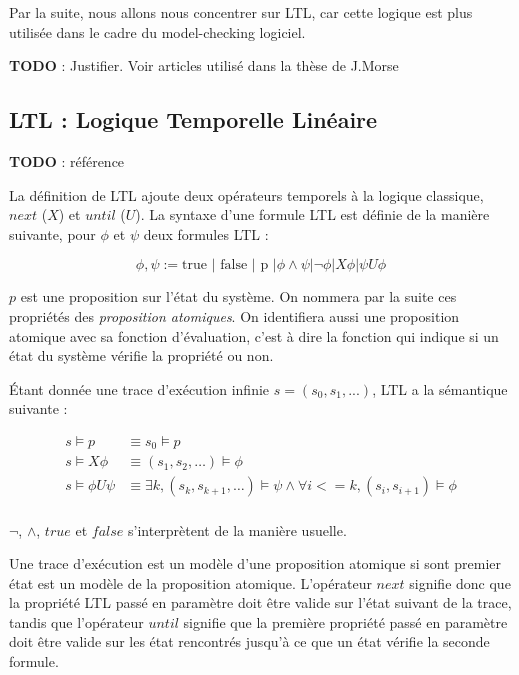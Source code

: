 Par la suite, nous allons nous concentrer sur LTL, car cette logique est
plus utilisée dans le cadre du model-checking logiciel.

\textbf{TODO} : Justifier. Voir articles utilisé dans la thèse de
J.Morse

\subsection{LTL : Logique Temporelle Linéaire}

\textbf{TODO} : référence

La définition de LTL ajoute deux opérateurs temporels à la logique
classique, \(next\) (\(X\)) et \(until\) (\(U\)). La syntaxe d'une
formule LTL est définie de la manière suivante, pour \(\phi\) et \(\psi\)
deux formules LTL :

\[
\phi, \psi := \text{true }| \text{ false } | \text{ p } |
             \phi \land \psi | \lnot \phi | X \phi | \psi U \phi
\]

\(p\) est une proposition sur l'état du système. On nommera par la suite
ces propriétés des \emph{proposition atomiques}. On identifiera aussi
une proposition atomique avec sa fonction d'évaluation, c'est à dire la
fonction qui indique si un état du système vérifie la propriété ou non.

Étant donnée une trace d'exécution infinie \(s = (s_0, s_1, ...)\), LTL a
la sémantique suivante :

\[
\begin{aligned}
s \models p & \equiv s_0 \models p \\
s \models X \phi & \equiv (s_1, s_2, \dots) \models \phi \\
s \models \phi U \psi & \equiv \exists k, (s_k, s_{k+1}, \dots) \models \psi
                        \land \forall i <= k, (s_i, s_{i+1}) \models \phi \\
\end{aligned}
\]

\(\lnot\), \(\land\), \(true\) et \(false\) s'interprètent de la manière
usuelle.

Une trace d'exécution est un modèle d'une proposition atomique si sont premier
état est un modèle de la proposition atomique.
L'opérateur \(next\) signifie donc que la propriété LTL passé en
paramètre doit être valide sur l'état suivant de la trace, tandis que
l'opérateur \(until\) signifie que la première propriété passé en
paramètre doit être valide sur les état rencontrés jusqu'à ce que un
état vérifie la seconde formule.

